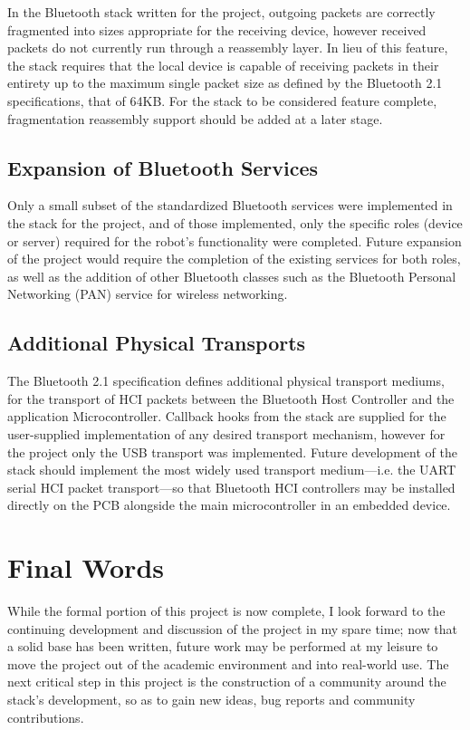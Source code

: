 In the Bluetooth stack written for the project, outgoing packets are correctly fragmented into sizes appropriate for the receiving device, however received packets do not currently run through a reassembly layer. In lieu of this feature, the stack requires that the local device is capable of receiving packets in their entirety up to the maximum single packet size as defined by the Bluetooth 2.1 specifications, that of 64KB. For the stack to be considered feature complete, fragmentation reassembly support should be added at a later stage.

\subsection{Expansion of Bluetooth Services}

Only a small subset of the standardized Bluetooth services were implemented in the stack for the project, and of those implemented, only the specific roles (device or server) required for the robot's functionality were completed. Future expansion of the project would require the completion of the existing services for both roles, as well as the addition of other Bluetooth classes such as the Bluetooth Personal Networking (PAN) service for wireless networking.

\subsection{Additional Physical Transports}

The Bluetooth 2.1 specification defines additional physical transport mediums, for the transport of HCI packets between the Bluetooth Host Controller and the application Microcontroller. Callback hooks from the stack are supplied for the user-supplied implementation of any desired transport mechanism, however for the project only the USB transport was implemented. Future development of the stack should implement the most widely used transport medium---i.e. the UART serial HCI packet transport---so that Bluetooth HCI controllers may be installed directly on the PCB alongside the main microcontroller in an embedded device.

\section{Final Words}

While the formal portion of this project is now complete, I look forward to the continuing development and discussion of the project in my spare time; now that a solid base has been written, future work may be performed at my leisure to move the project out of the academic environment and into real-world use. The next critical step in this project is the construction of a community around the stack's development, so as to gain new ideas, bug reports and community contributions.

